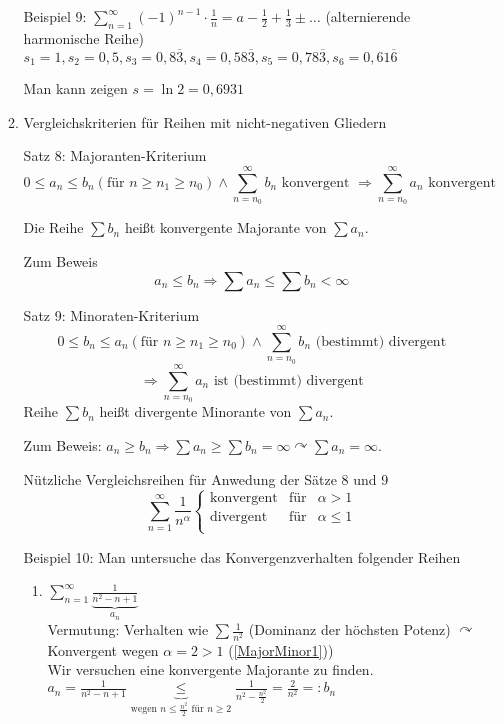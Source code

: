 \documentclass[a4paper]{scrartcl}
\begin{document}
\begin{enumerate}
\begin{enumerate}
Beispiel 9: $\sum\limits_{n=1}^{\infty} (-1)^{n-1} \cdot \frac{1}{n} = a - \frac{1}{2} + \frac{1}{3} \pm \dots$ (alternierende harmonische Reihe)\\
$s_1 = 1, s_2=0,5, s_3 = 0,8\overline{3}, s_4=0,58\overline{3}, s_5=0,78\overline{3}, s_6 = 0,61\overline{6}$

Man kann zeigen $s= \ln{2} = 0,6931$

\item Vergleichskriterien für Reihen mit nicht-negativen Gliedern

Satz 8: Majoranten-Kriterium
\[0 \leq a_n \leq b_n ( \text{für } n \geq n_1 \geq n_0)\wedge \sum\limits_{n = n_0}^{\infty} b_n \text{ konvergent } \Rightarrow \sum\limits_{n = n_0}^{\infty} a_n \text{ konvergent} \]

Die Reihe $\sum b_n$ heißt konvergente Majorante von $\sum a_n$.

Zum Beweis
\[ a_n \leq b_n \Rightarrow \sum a_n \leq  \sum b_n < \infty\]

Satz 9: Minoraten-Kriterium
\[ 0 \leq b_n \leq a_n (\text{für } n \geq n_1 \geq n_0) \wedge \sum\limits_{n=n_0}^{\infty} b_n \text{ (bestimmt) divergent}\]
\[\Rightarrow \sum\limits_{n=n_0}^{\infty} a_n \text{ ist (bestimmt) divergent}\]
Reihe $\sum b_n$ heißt divergente Minorante von $\sum a_n$.

Zum Beweis: $a_n \geq b_n \Rightarrow \sum a_n \geq \sum b_n  = \infty \curvearrowright \sum a_n = \infty$.

Nützliche Vergleichsreihen für Anwedung der Sätze 8 und 9
\begin{equation}\label{MajorMinor1}
\sum\limits_{n=1}^{\infty} \frac{1}{n^\alpha} \left\{ \begin{array}{rcl}
         \text{konvergent}
         & \mbox{für}
         & \alpha > 1 \\ 
        \text{divergent}
         & \mbox{für} 
         & \alpha \leq 1\\
                \end{array}\right.
\end{equation}

Beispiel 10: Man untersuche das Konvergenzverhalten folgender Reihen
\begin{enumerate}
\item $\sum\limits_{n=1}^{\infty} \underbrace{\frac{1}{n^2 -n +1}}_{a_n}$\\
Vermutung: Verhalten wie $\sum \frac{1}{n^2}$ (Dominanz der höchsten Potenz) $\curvearrowright$ Konvergent wegen $\alpha = 2 > 1$ (\ref{MajorMinor1}))\\
Wir versuchen eine konvergente Majorante zu finden.\\
$a_n = \frac{1}{n^2 - n+1} \underbrace{\leq}_{\text{wegen } n \leq \frac{n^2}{2} \text{ für } n \geq 2} \frac{1}{n^2 - \frac{n^2}{2}} = \frac{2}{n^2} =: b_n$


\end{enumerate}
\end{enumerate}
\end{enumerate}
\end{document}
